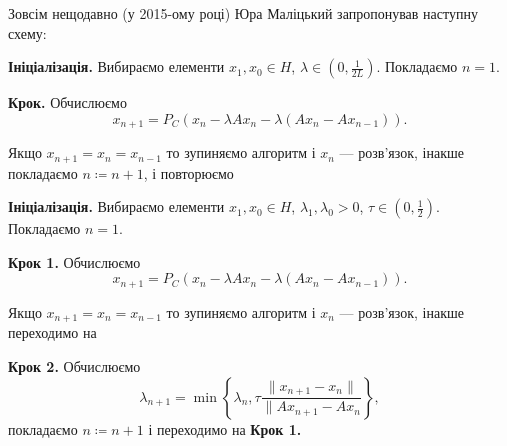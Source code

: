 Зовсім нещодавно (у 2015-ому році) Юра Маліцький запропонував наступну схему:

\begin{algorithm}
    \label{algo:malitsky-tam}
    \textbf{Ініціалізація.} Вибираємо елементи $x_1, x_0 \in H$, $\lambda \in (0, \frac{1}{2L})$. Покладаємо $n = 1$. \medskip

    \textbf{Крок.} Обчислюємо
    \begin{equation}
        x_{n + 1} = P_C (x_n - \lambda A x_n - \lambda (A x_n - A x_{n - 1})).
    \end{equation}
    
    Якщо $x_{n + 1} = x_n = x_{n - 1}$ то зупиняємо алгоритм і $x_n$ --- розв'язок, інакше покладаємо $n \coloneqq n + 1$, і повторюємо
\end{algorithm}

\begin{algorithm}
    \label{algo:adapt-malitsky-tam}
    \textbf{Ініціалізація.} Вибираємо елементи $x_1, x_0 \in H$, $\lambda_1, \lambda_0 > 0$, $\tau \in (0, \frac{1}{2})$. Покладаємо $n = 1$. \medskip

    \textbf{Крок 1.} Обчислюємо
    \begin{equation}
        x_{n + 1} = P_C (x_n - \lambda A x_n - \lambda (A x_n - A x_{n - 1})).
    \end{equation}
    
    Якщо $x_{n + 1} = x_n = x_{n - 1}$ то зупиняємо алгоритм і $x_n$ --- розв'язок, інакше переходимо на \medskip

    \textbf{Крок 2.} Обчислюємо
    \begin{equation}
        \lambda_{n + 1} = \min \left\{ \lambda_ n, \tau  \frac{\|x_{n + 1} - x_n\|}{\|A x_{n + 1} - A x_n} \right\},
    \end{equation}
    покладаємо $n \coloneqq n + 1$ і переходимо на \textbf{Крок 1.}
\end{algorithm}
